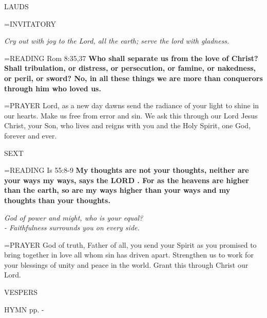 \begin{flushleft}\normalsize LAUDS\\\end{flushleft}

\hangindent=\parindent \small{INVITATORY}
\begin{center}
\textit{Cry out with joy to the Lord, all the earth; serve the lord with gladness.\\}
\end{center}

\hangindent=\parindent \small{READING} Rom 8:35,37 \textbf{Who shall separate us from the love of Christ? Shall tribulation, or distress, or persecution, or famine, or nakedness, or peril, or sword? No, in all these things we are more than conquerors through him who loved us.  \\}

\hangindent=\parindent \small{PRAYER  Lord, as a new day dawns send the radiance of your light to shine in our hearts. Make us free from error and sin. We ask this through our Lord Jesus Christ, your Son, who lives and reigns with you and the Holy Spirit, one God, forever and ever.  }

\begin{flushleft}\normalsize SEXT\\\end{flushleft}

\hangindent=\parindent \small{READING} Is 55:8-9 \textbf{My thoughts are not your thoughts, neither are your ways my ways, says the LORD . For as the heavens are higher than the earth, so are my ways higher than your ways and my thoughts than your thoughts.}

\begin{center}
\textit{God of power and might, who is your equal?\\
- Faithfulness surrounds you on every side.}
\end{center}

\hangindent=\parindent \small{PRAYER  God of truth, Father of all, you send your Spirit as you promised to bring together in love all whom sin has driven apart.  Strengthen us to work for your blessings of unity and peace in the world. Grant this through Christ our Lord.}

\begin{flushleft}\normalsize VESPERS\\\end{flushleft}

HYMN pp. \pageref{ordinaryTime:fourthHymn} - \pageref{ordinaryTime:sixthHymn}

